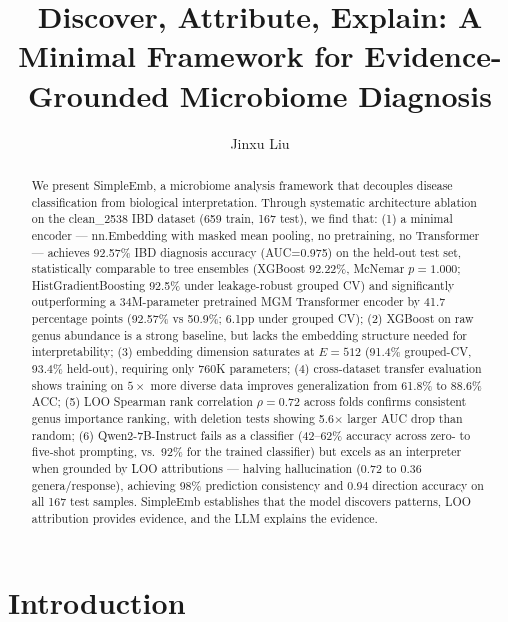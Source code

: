 \documentclass[11pt,a4paper]{article}
\title{Discover, Attribute, Explain: A Minimal Framework for Evidence-Grounded Microbiome Diagnosis}
\author{Jinxu Liu}
\date{}
\begin{document}
\maketitle

\begin{abstract}
We present SimpleEmb, a microbiome analysis framework that decouples disease classification from biological interpretation. Through systematic architecture ablation on the clean\_2538 IBD dataset (659 train, 167 test), we find that: (1) a minimal encoder --- nn.Embedding with masked mean pooling, no pretraining, no Transformer --- achieves 92.57\% IBD diagnosis accuracy (AUC=0.975) on the held-out test set, statistically comparable to tree ensembles (XGBoost 92.22\%, McNemar $p{=}1.000$; HistGradientBoosting 92.5\% under leakage-robust grouped CV) and significantly outperforming a 34M-parameter pretrained MGM Transformer encoder by 41.7 percentage points (92.57\% vs 50.9\%; 6.1pp under grouped CV); (2) XGBoost on raw genus abundance is a strong baseline, but lacks the embedding structure needed for interpretability; (3) embedding dimension saturates at $E{=}512$ (91.4\% grouped-CV, 93.4\% held-out), requiring only 760K parameters; (4) cross-dataset transfer evaluation shows training on $5\times$ more diverse data improves generalization from 61.8\% to 88.6\% ACC; (5) LOO Spearman rank correlation $\rho{=}0.72$ across folds confirms consistent genus importance ranking, with deletion tests showing 5.6$\times$ larger AUC drop than random; (6) Qwen2-7B-Instruct fails as a classifier (42--62\% accuracy across zero- to five-shot prompting, vs.\ 92\% for the trained classifier) but excels as an interpreter when grounded by LOO attributions --- halving hallucination (0.72 to 0.36 genera/response), achieving 98\% prediction consistency and 0.94 direction accuracy on all 167 test samples. SimpleEmb establishes that the model discovers patterns, LOO attribution provides evidence, and the LLM explains the evidence.
\end{abstract}

\section{Introduction}
\end{document}
